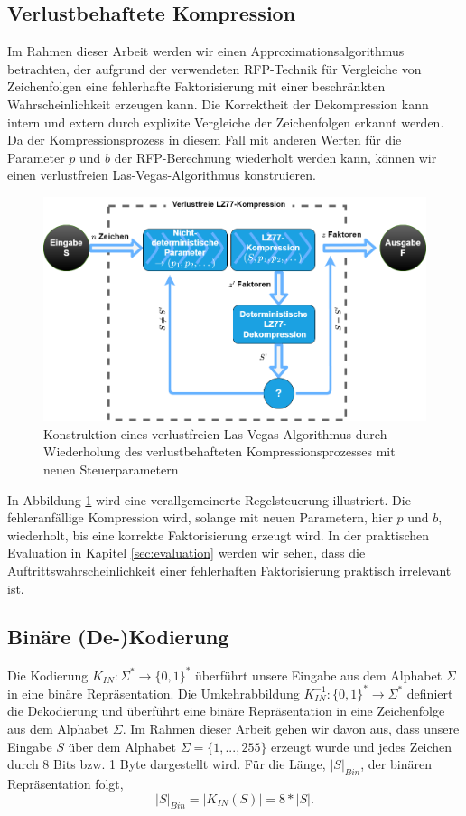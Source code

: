 \subsection{Verlustbehaftete Kompression}
Im Rahmen dieser Arbeit werden wir einen Approximationsalgorithmus betrachten, der aufgrund der verwendeten RFP-Technik für Vergleiche von Zeichenfolgen eine fehlerhafte Faktorisierung mit 
einer beschränkten Wahrscheinlichkeit erzeugen kann. Die Korrektheit der Dekompression kann intern und extern durch explizite Vergleiche der Zeichenfolgen erkannt werden. Da der
Kompressionsprozess in diesem Fall mit anderen Werten für die Parameter $p$ und $b$ der RFP-Berechnung wiederholt werden kann, können wir einen verlustfreien Las-Vegas-Algorithmus konstruieren.

\begin{figure} [ht]
    \centering
    \caption{Konstruktion eines verlustfreien Las-Vegas-Algorithmus durch Wiederholung des verlustbehafteten Kompressionsprozesses mit neuen Steuerparametern}
    \label{fig:lasvegas}
    \includegraphics[scale=0.4]{Images/lasvegas_algorithm.png}
\end{figure}

In Abbildung \ref{fig:lasvegas} wird eine verallgemeinerte Regelsteuerung illustriert. Die fehleranfällige Kompression wird, solange mit neuen Parametern, hier $p$ und $b$, wiederholt, bis
eine korrekte Faktorisierung erzeugt wird. In der praktischen Evaluation in Kapitel \ref{sec:evaluation} werden wir sehen, dass die Auftrittswahrscheinlichkeit einer fehlerhaften Faktorisierung
praktisch irrelevant ist.

\subsection{Binäre (De-)Kodierung}
Die Kodierung $K_{IN}: \Sigma^* \rightarrow \{0,1\}^*$ überführt unsere Eingabe aus dem Alphabet $\Sigma$ in eine binäre Repräsentation.
Die Umkehrabbildung $K^{-1}_{IN}: \{0,1\}^* \rightarrow \Sigma^*$ definiert die Dekodierung und überführt eine binäre Repräsentation in eine Zeichenfolge
aus dem Alphabet $\Sigma$. Im Rahmen dieser Arbeit gehen wir davon aus, dass unsere Eingabe $S$ über dem Alphabet $\Sigma=\{1,...,255\}$ erzeugt wurde und 
jedes Zeichen durch 8 Bits bzw. 1 Byte dargestellt wird. Für die Länge, $|S|_{Bin}$, der binären Repräsentation folgt,
\begin{equation}
    |S|_{Bin} = |K_{IN}(S)| = 8*|S|.
\end{equation}


